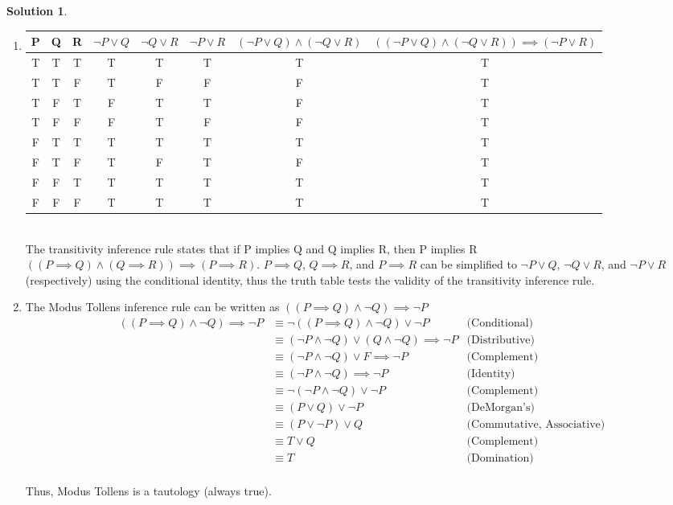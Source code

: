 \documentclass{article}
\theoremstyle{definition}
\newtheorem*{solution}{Solution}
\begin{document}
\begin{solution}
\end{solution}
\begin{enumerate}[label = \alph*)]
    \item
    \begin{tabular}{|c|c|c|c|c|c|c|c|}
         \hline
         P & Q & R & $\neg P \vee Q$ & $\neg Q \vee R$ & $\neg P \vee R$ & $(\neg P \vee Q) \wedge (\neg Q \vee R)$ & $((\neg P \vee Q) \wedge (\neg Q \vee R)) \implies (\neg P \vee R)$\\ \hline
         T & T & T & T & T & T & T & T \\ \hline
         T & T & F & T & F & F & F & T \\ \hline 
         T & F & T & F & T & T & F & T \\ \hline
         T & F & F & F & T & F & F & T \\ \hline
         F & T & T & T & T & T & T & T \\ \hline
         F & T & F & T & F & T & F & T \\ \hline
         F & F & T & T & T & T & T & T \\ \hline
         F & F & F & T & T & T & T & T \\ \hline 
    \end{tabular}
    \\
    The transitivity inference rule states that if P implies Q and Q implies R, then P implies R $((P\implies Q) \wedge (Q \implies R)) \implies (P \implies R)$. $P\implies Q$, $Q \implies R$, and $P\implies R$ can be simplified to $\neg P \vee Q$, $\neg Q \vee R$, and $\neg P \vee R$ (respectively) using the conditional identity, thus the truth table tests the validity of the transitivity inference rule.
    
    \item
    The Modus Tollens inference rule can be written as $((P\implies Q) \wedge \neg Q) \implies \neg P$
    \begin{align*}
        ((P\implies Q) \wedge \neg Q) \implies \neg P &\equiv \neg ((P\implies Q) \wedge \neg Q) \vee \neg P &\text{(Conditional)}\\ 
        &\equiv (\neg P \wedge \neg Q) \vee (Q \wedge \neg Q) \implies \neg P &\text{(Distributive)}\\
        &\equiv (\neg P \wedge \neg Q) \vee F \implies \neg P &\text{(Complement)}\\
        &\equiv (\neg P \wedge \neg Q) \implies \neg P &\text{(Identity)}\\
        &\equiv \neg (\neg P \wedge \neg Q) \vee \neg P &\text{(Complement)}\\
        &\equiv (P \vee Q) \vee \neg P &\text{(DeMorgan's)}\\
        &\equiv (P \vee \neg P) \vee Q &\text{(Commutative, Associative)}\\
        &\equiv T \vee Q &\text{(Complement)}\\
        &\equiv T &\text{(Domination)}
    \end{align*}
    \\Thus, Modus Tollens is a tautology (always true).
    

\end{enumerate}
\end{document}
